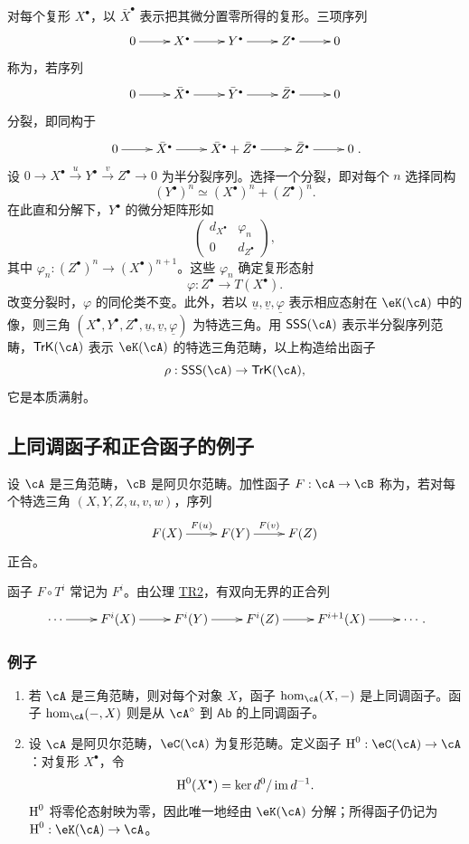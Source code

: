 对每个复形 $X^\bullet$，以 $\bar X^\bullet$ 表示把其微分置零所得的复形。三项序列
\[\xymatrix{0\ar[r]&X^\bullet\ar[r]&Y^\bullet\ar[r]&Z^\bullet\ar[r]&0}\]
称为，若序列
\[\xymatrix{0\ar[r]&\bar X^\bullet\ar[r]&\bar Y^\bullet\ar[r]&\bar Z^\bullet\ar[r]&0}\]
分裂，即同构于
\[\xymatrix{0\ar[r]&\bar X^\bullet\ar[r]&\bar X^\bullet+\bar Z^\bullet\ar[r]&\bar Z^\bullet\ar[r]&0}.\]
设 $0\to X^\bullet\xrightarrow{u}Y^\bullet\xrightarrow{v}Z^\bullet\to0$ 为半分裂序列。选择一个分裂，即对每个 $n$ 选择同构
\[(Y^\bullet)^n\simeq(X^\bullet)^n+(Z^\bullet)^n.\]
在此直和分解下，$Y^\bullet$ 的微分矩阵形如
\[\begin{pmatrix}d_{X^\bullet}&\varphi_n\\0&d_{Z^\bullet}\end{pmatrix},\]
其中 $\varphi_n:(Z^\bullet)^n\to(X^\bullet)^{n+1}$。这些 $\varphi_n$ 确定复形态射
\[\varphi:Z^\bullet\to T(X^\bullet).\]
改变分裂时，$\varphi$ 的同伦类不变。此外，若以 $\underline u,\underline v,\underline\varphi$ 表示相应态射在 $\eK(\cA)$ 中的像，则三角 $(X^\bullet,Y^\bullet,Z^\bullet,\underline u,\underline v,\underline\varphi)$ 为特选三角。用 $\mathsf{SSS}(\cA)$ 表示半分裂序列范畴，$\mathsf{TrK}(\cA)$ 表示 $\eK(\cA)$ 的特选三角范畴，以上构造给出函子
\[\rho:\mathsf{SSS}(\cA)\to\mathsf{TrK}(\cA),\]
它是本质满射。
\subsection{上同调函子和正合函子的例子}\label{VIII:1-3}
\begin{definition}
设 $\cA$ 是三角范畴，$\cB$ 是阿贝尔范畴。加性函子 $F:\cA\to\cB$ 称为，若对每个特选三角 $(X,Y,Z,u,v,w)$，序列
\[\xymatrix{F(X)\ar[r]^-{F(u)}&F(Y)\ar[r]^-{F(v)}&F(Z)}\]
正合。
\end{definition}
函子 $F\circ T^i$ 常记为 $F^i$。由公理 \hyperlink{VIII:TR2}{TR2}，有双向无界的正合列
\[\xymatrix{\cdots\ar[r]&F^i(X)\ar[r]&F^i(Y)\ar[r]&F^i(Z)\ar[r]&F^{i+1}(X)\ar[r]&\cdots}.\]
\subsubsection{例子}\label{VIII:1-3-2}
\begin{enumerate}
\item 若 $\cA$ 是三角范畴，则对每个对象 $X$，函子 $\hom_\cA(X,-)$ 是上同调函子。函子 $\hom_\cA(-,X)$ 则是从 $\cA^\circ$ 到 $\mathsf{Ab}$ 的上同调函子。
\item 设 $\cA$ 是阿贝尔范畴，$\eC(\cA)$ 为复形范畴。定义函子 $\h^0:\eC(\cA)\to\cA$：对复形 $X^\bullet$，令
\[\h^0(X^\bullet)=\ker d^0/\im d^{-1}.\]
$\operatorname{H}^0$ 将零伦态射映为零，因此唯一地经由 $\eK(\cA)$ 分解；所得函子仍记为 $\h^0:\eK(\cA)\to\cA$。
\end{enumerate}
